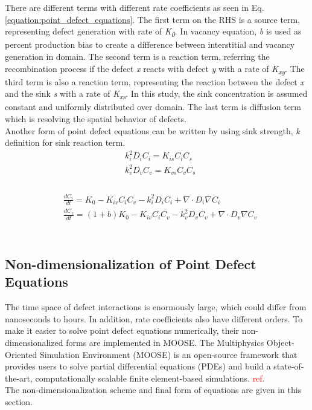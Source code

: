\documentclass[a4paper]{article}
\begin{document}
There are different terms with different rate coefficients as seen in Eq. \ref{equation:point_defect_equations}. The first term on the RHS is a source term, representing defect generation with rate of \textit{K\textsubscript{0}}. In vacancy equation, \textit{b} is used as percent production bias to create a difference between interstitial and vacancy generation in domain. The second term is a reaction term, referring the recombination process if the defect \textit{x} reacts with defect \textit{y} with a rate of \textit{K\textsubscript{xy}}. The third term is also a reaction term, representing the reaction between the defect \textit{x} and the sink \textit{s} with a rate of \textit{K\textsubscript{xs}}. In this study, the sink concentration is assumed constant and uniformly distributed over domain. The last term is diffusion term which is resolving the spatial behavior of defects.\\

Another form of point defect equations can be written by using sink strength, \textit{k} definition for sink reaction term.\\

\begin{equation}
  \begin{aligned}
    &k_i^2D_iC_i = K_{is}C_iC_s \\
    &k_v^2D_vC_v = K_{vs}C_vC_s \\
  \end{aligned}
  \label{equation:sink_reaction_term}
\end{equation}\\
\begin{equation}
  \begin{aligned}
    &\frac{dC_i}{dt} = K_0 - K_{iv}C_iC_v - k_i^2D_iC_i + \nabla\cdot D_i\nabla C_i\\
    &\frac{dC_v}{dt} = (1+b)K_0 - K_{iv}C_iC_v - k_v^2D_vC_v + \nabla\cdot D_v\nabla C_v\\
  \end{aligned}
  \label{equation:point_defect_equations_sink_strength}
\end{equation}\\

\subsection{Non-dimensionalization of Point Defect Equations} \hspace{10pt}
The time space of defect interactions is enormously large, which could differ from nanoseconds to hours. In addition, rate coefficients also have different orders. To make it easier to solve point defect equations numerically, their non-dimensionalized forms are implemented in MOOSE. The Multiphysics Object-Oriented Simulation Environment (MOOSE) is an open-source framework that provides users to solve partial differential equations (PDEs) and build a state-of-the-art, computationally scalable finite element-based simulations.     \textcolor{red}{ref.} \\ The non-dimensionalization scheme and final form of equations are given in this section.
\end{document}
